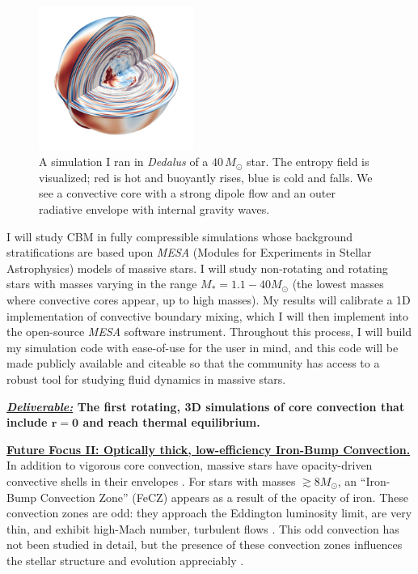 \documentclass[12pt]{article}
\newcommand{\sct}[1]{\vspace{0.3cm}\hspace{-\parindent}\textbf{\underline{#1}}\hspace{0.3cm}}
\begin{document}
\begin{figure}
  \begin{center}
      \vspace{-1.6cm}
    \includegraphics[width=0.45\textwidth]{dedalus_massive_star.png}
      \vspace{-1.3cm}
  \end{center}
    \caption{A simulation I ran in \emph{Dedalus} of a {$40 \,M_{\odot}$} star. 
    The entropy field is visualized; red is hot and buoyantly rises, blue is cold and falls. 
    We see a convective core with a strong dipole flow and an outer radiative envelope with internal gravity waves. \label{fig:star}}
    \vspace{-0.5cm}
\end{figure}
I will study CBM in fully compressible simulations whose background stratifications are based upon \emph{MESA} (Modules for Experiments in Stellar Astrophysics) models of massive stars.
I will study non-rotating and rotating stars with masses varying in the range $M_* = 1.1-40 M_{\odot}$ (the lowest masses where convective cores appear, up to high masses).
My results will calibrate a 1D implementation of convective boundary mixing, which I will then implement into the open-source \emph{MESA} software instrument.
Throughout this process, I will build my simulation code with ease-of-use for the user in mind, and this code will be made publicly available and citeable so that the community has access to a robust tool for studying fluid dynamics in massive stars.

\textbf{\underline{\emph{Deliverable:}} The first rotating, 3D simulations of core convection that include $\boldsymbol{r = 0}$ and reach thermal equilibrium.}

\sct{Future Focus II: Optically thick, low-efficiency Iron-Bump Convection.}
In addition to vigorous core convection, massive stars have opacity-driven convective shells in their envelopes \citep{cantiello_etal_2009}.
For stars with masses $\gtrsim 8 M_{\odot}$, an ``Iron-Bump Convection Zone'' (FeCZ) appears as a result of the opacity of iron.
These convection zones are odd: they approach the Eddington luminosity limit, are very thin, and exhibit high-Mach number, turbulent flows \citep{jermyn_etal_2022_atlas}.
This odd convection has not been studied in detail, but the presence of these convection zones influences the stellar structure and evolution appreciably \citep{kohler_etal_2015}.
\end{document}

